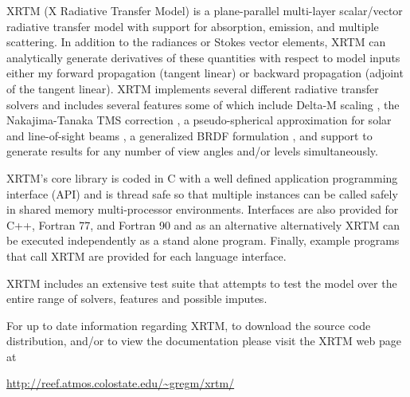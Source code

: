 %
\tableofcontents


%
\mainmatter


\setlength{\parskip}{5.0pt}


\label{introduction_to_xrtm}

XRTM (X Radiative Transfer Model) is a plane-parallel multi-layer scalar/vector radiative transfer model with support for absorption, emission, and multiple scattering.   In addition to the radiances or Stokes vector elements, XRTM can analytically generate derivatives of these quantities with respect to model inputs either my forward propagation (tangent linear) or backward propagation (adjoint of the tangent linear).  XRTM implements several different radiative transfer solvers and includes several features some of which include Delta-M scaling \citep{wiscombe_w_j_1977a}, the Nakajima-Tanaka TMS correction \citep{nakajima_t_1988}, a pseudo-spherical approximation for solar and line-of-sight beams \citep{dahlback_arne_1991}, a generalized BRDF formulation \citep{spurr_r_j_d_2004}, and support to generate results for any number of view angles and/or levels simultaneously.

XRTM's core library is coded in C with a well defined application programming interface (API) and is thread safe so that multiple instances can be called safely in shared memory multi-processor environments.  Interfaces are also provided for C++, Fortran 77, and Fortran 90 and as an alternative alternatively XRTM can be executed independently as a stand alone program.  Finally, example programs that call XRTM are provided for each language interface.

XRTM includes an extensive test suite that attempts to test the model over the entire range of solvers, features and possible imputes.

For up to date information regarding XRTM, to download the source code distribution, and/or to view the documentation please visit the XRTM web page at
\begin{list}{}{}
\item \url{http://reef.atmos.colostate.edu/~gregm/xrtm/}
\end{list}

